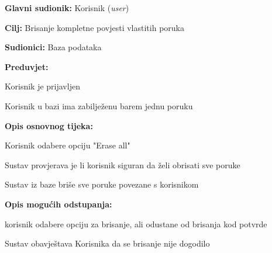 				
					\noindent {}
				\begin{packed_item}
					
					\item \textbf{Glavni sudionik: }Korisnik (\textit{user})
					\item  \textbf{Cilj: }Brisanje kompletne povjesti vlastitih poruka
					\item  \textbf{Sudionici: }Baza podataka
						\item  \textbf{Preduvjet: }
					\begin{packed_enum}
						\item Korisnik je prijavljen \item Korisnik u bazi ima zabilježenu barem jednu poruku	\end{packed_enum}
					\item  \textbf{Opis osnovnog tijeka: }
					
					\item[] \begin{packed_enum}
						
						\item Korisnik odabere opciju "Erase all"
						\item Sustav provjerava je li korisnik siguran da želi obrisati sve poruke
						\item Sustav iz baze briše sve poruke povezane s korisnikom
						
					\end{packed_enum}
					
					\item  \textbf{Opis mogućih odstupanja: }
					
					\item[] \begin{packed_item}
						
							\item[1] korisnik odabere opciju za brisanje, ali odustane od brisanja kod potvrde
						\item[ ] \begin{packed_enum}
							
							\item[1.1]Sustav obavještava Korisnika da se brisanje nije dogodilo				
						\end{packed_enum}
						
					\end{packed_item}
				\end{packed_item}
			\noindent {}
